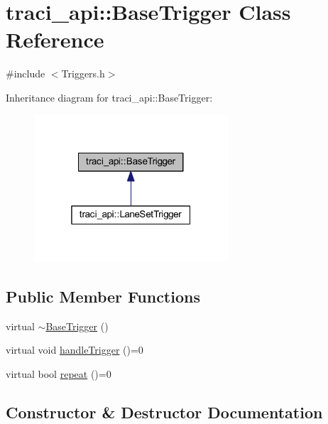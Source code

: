 \hypertarget{classtraci__api_1_1_base_trigger}{}\section{traci\+\_\+api\+:\+:Base\+Trigger Class Reference}
\label{classtraci__api_1_1_base_trigger}


{\ttfamily \#include $<$Triggers.\+h$>$}



Inheritance diagram for traci\+\_\+api\+:\+:Base\+Trigger\+:
\nopagebreak
\begin{figure}[H]
\begin{center}
\leavevmode
\includegraphics[width=205pt]{classtraci__api_1_1_base_trigger__inherit__graph}
\end{center}
\end{figure}
\subsection*{Public Member Functions}
\begin{DoxyCompactItemize}
\item 
virtual \hyperlink{classtraci__api_1_1_base_trigger_ae1e572064f6b16fa1de9e5416b6c1a9c}{$\sim$\+Base\+Trigger} ()
\item 
virtual void \hyperlink{classtraci__api_1_1_base_trigger_a2de2824fb1d228d4c04aa15c272017a5}{handle\+Trigger} ()=0
\item 
virtual bool \hyperlink{classtraci__api_1_1_base_trigger_a7d2b1ac3f54e42e71eae69f1c7f33943}{repeat} ()=0
\end{DoxyCompactItemize}


\subsection{Constructor \& Destructor Documentation}
\mbox{\label{classtraci__api_1_1_base_trigger_ae1e572064f6b16fa1de9e5416b6c1a9c}} 
